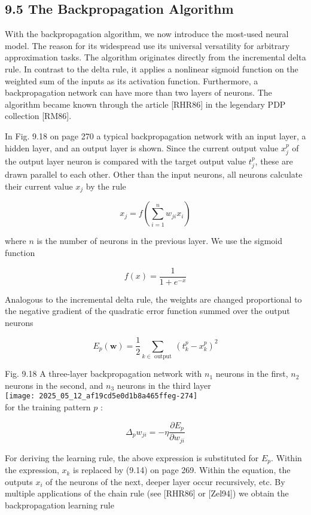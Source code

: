 \documentclass[10pt]{article}
\begin{document}
\subsection*{9.5 The Backpropagation Algorithm}
With the backpropagation algorithm, we now introduce the most-used neural model. The reason for its widespread use its universal versatility for arbitrary approximation tasks. The algorithm originates directly from the incremental delta rule. In contrast to the delta rule, it applies a nonlinear sigmoid function on the weighted sum of the inputs as its activation function. Furthermore, a backpropagation network can have more than two layers of neurons. The algorithm became known through the article [RHR86] in the legendary PDP collection [RM86].

In Fig. 9.18 on page 270 a typical backpropagation network with an input layer, a hidden layer, and an output layer is shown. Since the current output value $x_{j}^{p}$ of the output layer neuron is compared with the target output value $t_{j}^{p}$, these are drawn parallel to each other. Other than the input neurons, all neurons calculate their current value $x_{j}$ by the rule


\begin{equation*}
x_{j}=f\left(\sum_{i=1}^{n} w_{j i} x_{i}\right) \tag{9.14}
\end{equation*}


where $n$ is the number of neurons in the previous layer. We use the sigmoid function

$$
f(x)=\frac{1}{1+e^{-x}}
$$

Analogous to the incremental delta rule, the weights are changed proportional to the negative gradient of the quadratic error function summed over the output neurons

$$
E_{p}(\boldsymbol{w})=\frac{1}{2} \sum_{k \in \text { output }}\left(t_{k}^{p}-x_{k}^{p}\right)^{2}
$$

Fig. 9.18 A three-layer backpropagation network with $n_{1}$ neurons in the first, $n_{2}$ neurons in the second, and $n_{3}$ neurons in the third layer\\
\texttt{[image: 2025\_05\_12\_af19cd5e0d1b8a465ffeg-274]}\\
for the training pattern $p$ :

$$
\Delta_{p} w_{j i}=-\eta \frac{\partial E_{p}}{\partial w_{j i}}
$$

For deriving the learning rule, the above expression is substituted for $E_{p}$. Within the expression, $x_{k}$ is replaced by (9.14) on page 269. Within the equation, the outputs $x_{i}$ of the neurons of the next, deeper layer occur recursively, etc. By multiple applications of the chain rule (see [RHR86] or [Zel94]) we obtain the backpropagation learning rule
\end{document}
